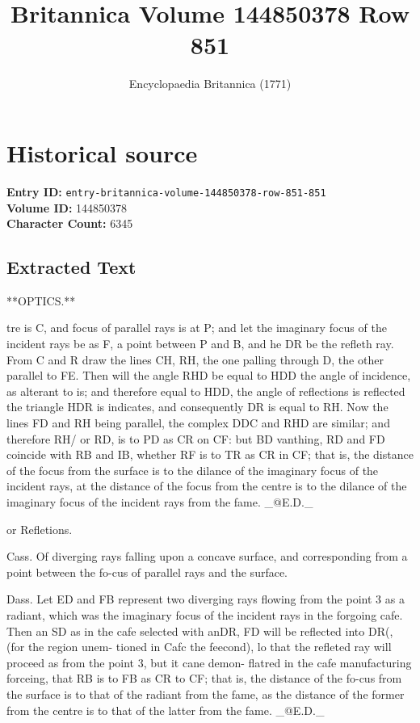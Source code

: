 \documentclass{article}
\title{Britannica Volume 144850378 Row 851}
\date{Encyclopaedia Britannica (1771)}
\begin{document}
\maketitle

\section*{Historical source}
\textbf{Entry ID:} \texttt{entry-britannica-volume-144850378-row-851-851} \\
\textbf{Volume ID:} 144850378 \\
\textbf{Character Count:} 6345

\subsection*{Extracted Text}
**OPTICS.**

tre is C, and focus of parallel rays is at P; and let the imaginary focus of the incident rays be as F, a point between P and B, and he DR be the refleth ray. From C and R draw the lines CH, RH, the one palling through D, the other parallel to FE. Then will the angle RHD be equal to HDD the angle of incidence, as alterant to is; and therefore equal to HDD, the angle of reflections is reflected the triangle HDR is indicates, and consequently DR is equal to RH. Now the lines FD and RH being parallel, the complex DDC and RHD are similar; and therefore RH/ or RD, is to PD as CR on CF: but BD vanthing, RD and FD coincide with RB and IB, whether RF is to TR as CR in CF; that is, the distance of the focus from the surface is to the dilance of the imaginary focus of the incident rays, at the distance of the focus from the centre is to the dilance of the imaginary focus of the incident rays from the fame. \_@E.D.\_

or Refletions.

Cass. Of diverging rays falling upon a concave surface, and corresponding from a point between the fo-cus of parallel rays and the surface.

Dass. Let ED and FB represent two diverging rays flowing from the point 3 as a radiant, which was the imaginary focus of the incident rays in the forgoing cafe. Then an SD as in the cafe selected with anDR, FD will be reflected into DR(, (for the region unem- tioned in Cafc the feecond), lo that the refleted ray will proceed as from the point 3, but it cane demon- flatred in the cafe manufacturing forceing, that RB is to FB as CR to CF; that is, the distance of the fo-cus from the surface is to that of the radiant from the fame, as the distance of the former from the centre is to that of the latter from the fame. \_@E.D.\_
\end{document}

